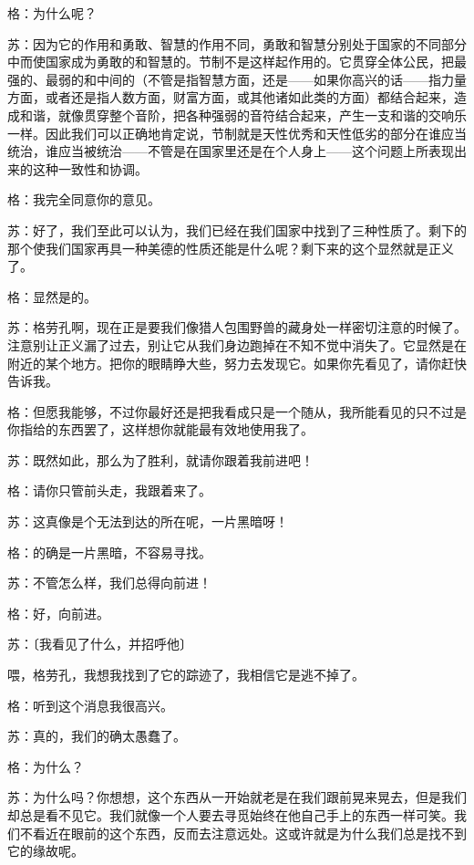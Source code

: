 \documentclass[12pt,oneside]{book}
\begin{document}
格：为什么呢？

苏：因为它的作用和勇敢、智慧的作用不同，勇敢和智慧分别处于国家的不同部分中而使国家成为勇敢的和智慧的。节制不是这样起作用的。它贯穿全体公民，把最强的、最弱的和中间的（不管是指智慧方面，还是——如果你高兴的话——指力量方面，或者还是指人数方面，财富方面，或其他诸如此类的方面）都结合起来，造成和谐，就像贯穿整个音阶，把各种强弱的音符结合起来，产生一支和谐的交响乐一样。因此我们可以正确地肯定说，节制就是天性优秀和天性低劣的部分在谁应当统治，谁应当被统治——不管是在国家里还是在个人身上——这个问题上所表现出来的这种一致性和协调。

格：我完全同意你的意见。

苏：好了，我们至此可以认为，我们已经在我们国家中找到了三种性质了。剩下的那个使我们国家再具一种美德的性质还能是什么呢？剩下来的这个显然就是正义了。

格：显然是的。

苏：格劳孔啊，现在正是要我们像猎人包围野兽的藏身处一样密切注意的时候了。注意别让正义漏了过去，别让它从我们身边跑掉在不知不觉中消失了。它显然是在附近的某个地方。把你的眼睛睁大些，努力去发现它。如果你先看见了，请你赶快告诉我。

格：但愿我能够，不过你最好还是把我看成只是一个随从，我所能看见的只不过是你指给的东西罢了，这样想你就能最有效地使用我了。

苏：既然如此，那么为了胜利，就请你跟着我前进吧！

格：请你只管前头走，我跟着来了。

苏：这真像是个无法到达的所在呢，一片黑暗呀！

格：的确是一片黑暗，不容易寻找。

苏：不管怎么样，我们总得向前进！

格：好，向前进。

苏：〔我看见了什么，并招呼他〕





喂，格劳孔，我想我找到了它的踪迹了，我相信它是逃不掉了。





格：听到这个消息我很高兴。

苏：真的，我们的确太愚蠢了。

格：为什么？

苏：为什么吗？你想想，这个东西从一开始就老是在我们跟前晃来晃去，但是我们却总是看不见它。我们就像一个人要去寻觅始终在他自己手上的东西一样可笑。我们不看近在眼前的这个东西，反而去注意远处。这或许就是为什么我们总是找不到它的缘故呢。
\end{document}
